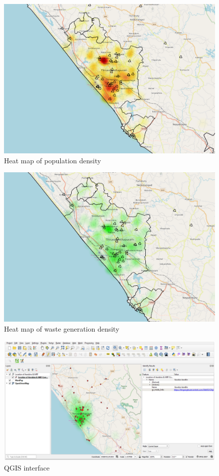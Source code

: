 \documentclass[12pt,a4paper]{  report}
\begin{document}
\begin{figure}
	\centering
	\includegraphics[width=0.6\linewidth]{popdens}
	\caption{Heat map of population density}
	\label{fig:popdens}
\end{figure}

\begin{figure}
	\centering
	\includegraphics[width=0.6\linewidth]{wastedens}
	\caption{Heat map of waste generation density}
	\label{fig:wastedens}
\end{figure}

\begin{figure}
	\centering
	\includegraphics[width=1\linewidth]{qgis_ui}
	\caption{QGIS interface}
	\label{fig:qgisui}
\end{figure}
\end{document}
